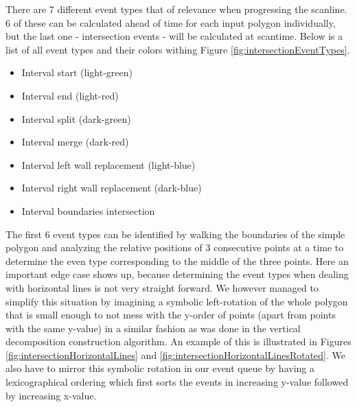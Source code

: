 \documentclass[12pt]{article}
\begin{document}
There are 7 different event types that of relevance when progressing the scanline. 6 of these can be calculated ahead of time for each input polygon individually, but the last one - intersection events - will be calculated at scantime. Below is a list of all event types and their colors withing Figure \ref{fig:intersectionEventTypes}. 
\begin{itemize}
    \item Interval start (light-green)
    \item Interval end (light-red)
    \item Interval split (dark-green)
    \item Interval merge (dark-red)
    \item Interval left wall replacement (light-blue)
    \item Interval right wall replacement (dark-blue)
    \item Interval boundaries intersection
\end{itemize}
The first 6 event types can be identified by walking the boundaries of the simple polygon and analyzing the relative positions of 3 consecutive points at a time to determine the even type corresponding to the middle of the three points.
Here an important edge case shows up, because determining the event types when dealing with horizontal lines is not very straight forward. We however managed to simplify this situation by imagining a symbolic left-rotation of the whole polygon that is small enough to not mess with the y-order of points (apart from points with the same y-value) in a similar fashion as was done in the vertical decomposition construction algorithm. An example of this is illustrated in Figures \ref{fig:intersectionHorizontalLines} and \ref{fig:intersectionHorizontalLinesRotated}. We also have to mirror this symbolic rotation in our event queue by having a lexicographical ordering which first sorts the events in increasing y-value followed by increasing x-value. 
\end{document}
